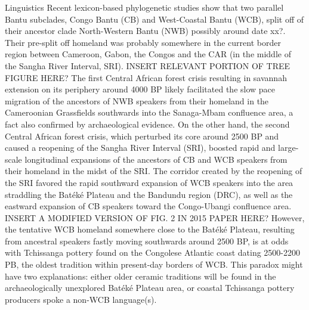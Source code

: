 \documentclass[a0]{sciposter}
\begin{document}
{\begin{minipage}[t][102cm][t]{82cm}
\begin{minipage}[t]{77cm}
\begin{multicols}{3}
\vfill\null
\columnbreak
{\fontsize{38}{42} \selectfont \textcolor{HeadCol}{Linguistics}}
\bigbreak
{\fontsize{28}{36} \selectfont Recent lexicon-based phylogenetic studies show that two parallel Bantu subclades, Congo Bantu (CB) and West-Coastal Bantu (WCB), split off of their ancestor clade North-Western Bantu (NWB) possibly around date xx?. Their pre-split off homeland was probably somewhere in the current border region between Cameroon, Gabon, the Congos and the CAR (in the middle of the Sangha River Interval, SRI).}
\bigbreak
INSERT RELEVANT PORTION OF TREE FIGURE HERE?
\bigbreak
{\fontsize{28}{36} \selectfont The first Central African forest crisis resulting in savannah extension on its periphery around 4000 BP likely facilitated the slow pace migration of the ancestors of NWB speakers from their homeland in the Cameroonian Grassfields southwards into the Sanaga-Mbam confluence area, a fact also confirmed by archaeological evidence.}
\bigbreak
{\fontsize{28}{36} \selectfont On the other hand, the second Central African forest crisis, which perturbed its core around 2500 BP and caused a reopening of the Sangha River Interval (SRI), boosted rapid and large-scale longitudinal expansions of the ancestors of CB and WCB speakers from their homeland in the midst of the SRI. The corridor created by the reopening of the SRI favored the rapid southward expansion of WCB speakers into the area straddling the Batéké Plateau and the Bandundu region (DRC), as well as the eastward expansion of CB speakers toward the Congo-Ubangi confluence area.}
\bigbreak
INSERT A MODIFIED VERSION OF FIG. 2 IN 2015 PAPER HERE?
\bigbreak
{\fontsize{28}{36} \selectfont However, the tentative WCB homeland somewhere close to the Batéké Plateau, resulting from ancestral speakers fastly moving southwards around 2500 BP, is at odds with Tchissanga pottery found on the Congolese Atlantic coast dating 2500-2200 PB, the oldest tradition within present-day borders of WCB. This paradox might have two explanations: either older ceramic traditions will be found in the archaeologically unexplored Batéké Plateau area, or coastal Tchissanga pottery producers spoke a non-WCB language(s).}

\vfill

\end{multicols}
\end{minipage}
\end{minipage}}
\end{document}

